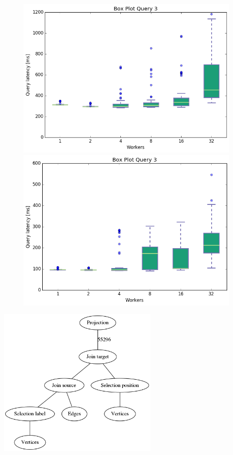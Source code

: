 \documentclass[11pt,singlecolumn]{scrartcl}
\begin{document}
\begin{figure}[!tbp]
  \centering
  \RawFloats
  \begin{minipage}[b]{0.5\textwidth}
    \includegraphics[width=\textwidth]{boxesjl/q3}
  \end{minipage}
  \hfill
  \begin{minipage}[b]{0.5\textwidth}
    \includegraphics[width=\textwidth]{boxesjs/q3}
  \end{minipage}
\end{figure}
\clearpage
\includegraphics[width=0.6\textwidth]{graph3}
\end{document}
